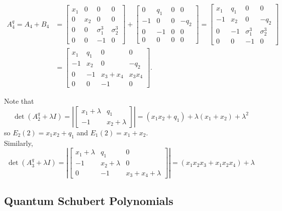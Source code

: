 \documentclass[11pt]{article}
\begin{document}
\begin{eg}[$Fl(1, 2, 4)$ Calculations]
\begin{align*}
A_4^q = A_4 + B_4 &=
\begin{bmatrix}
x_1 & 0 & 0 & 0 \\
0 & x_2 & 0 & 0 \\
0 & 0 & \sigma_1^3 & \sigma_2^3 \\
0 & 0 & -1 & 0
\end{bmatrix} + 
\begin{bmatrix}
0 & q_1 & 0 & 0 \\
-1 & 0 & 0 & -q_2 \\
0 & -1 & 0 & 0 \\
0 & 0 & 0 & 0
\end{bmatrix}
=
\begin{bmatrix}
    x_1 & q_1 & 0 & 0 \\
    -1 & x_2 & 0 & -q_2 \\
    0 & -1 & \sigma_1^3 & \sigma_2^3 \\
    0 & 0 & -1 & 0
\end{bmatrix} \\
&= 
\begin{bmatrix}
    x_1 & q_1 & 0 & 0 \\
    -1 & x_2 & 0 & -q_2 \\
    0 & -1 & x_3 + x_4 & x_3x_4 \\
    0 & 0 & -1 & 0
\end{bmatrix}.
\end{align*}

Note that 
\[
    \det(A_2^q + \lambda I) = \left|
    \begin{bmatrix}
    x_1 + \lambda & q_1 \\
    -1 & x_2 + \lambda
    \end{bmatrix}
    \right| = (x_1x_2 + q_1) + \lambda(x_1 + x_2) + \lambda^2
\]
so $E_2(2) = x_1x_2 + q_1$ and $E_1(2) = x_1 + x_2$. \\

Similarly, 
\[
    \det(A_3^q + \lambda I) = \left|
    \begin{bmatrix}
    x_1 + \lambda & q_1 & 0 \\
    -1 & x_2 + \lambda & 0 \\
    0 & -1 & x_3 + x_4 + \lambda
    \end{bmatrix}
    \right| = (x_1x_2x_3 + x_1x_2x_4) + \lambda
\]

\end{eg}
\subsection{Quantum Schubert Polynomials}
\end{document}
